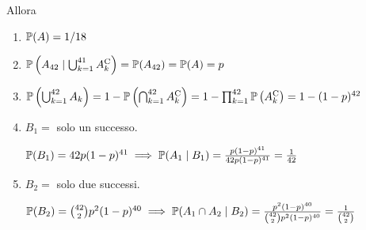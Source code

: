 Allora
\begin{enumerate}
\item $\mathbb{P}( A) =1/18$
\item $\mathbb{P}\left( A_{42} \mid \bigcup _{k=1}^{41} A_{k}^{\mathrm{C}}\right) =\mathbb{P}( A_{42}) =\mathbb{P}( A) =p$
\item $\mathbb{P}\left(\bigcup _{k=1}^{42} A_{k}\right) =1-\mathbb{P}\left(\bigcap _{k=1}^{42} A_{k}^{\mathrm{C}}\right) =1-\prod _{k=1}^{42}\mathbb{P}\left( A_{k}^{\mathrm{C}}\right) =1-( 1-p)^{42}$
\item $B_{1} =$ solo un successo.

$\mathbb{P}( B_{1}) =42p( 1-p)^{41} \implies \mathbb{P}( A_{1} \mid B_{1}) =\frac{p( 1-p)^{41}}{42p( 1-p)^{41}} =\frac{1}{42}$
\item $B_{2} =$ solo due successi.

$\mathbb{P}( B_{2}) =\binom{42}{2} p^{2}( 1-p)^{40} \implies \mathbb{P}( A_{1} \cap A_{2} \mid B_{2}) =\frac{p^{2}( 1-p)^{40}}{\binom{42}{2} p^{2}( 1-p)^{40}} =\frac{1}{\binom{42}{2}}$
\end{enumerate}
\Soluzione

